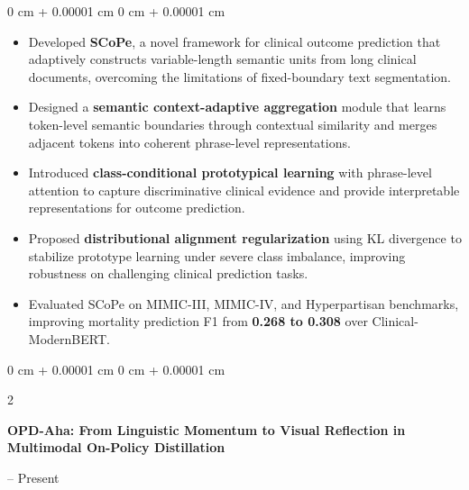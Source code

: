 \documentclass[10pt, letterpaper]{article}
\newenvironment{highlights}{
    \begin{itemize}[
        topsep=0.10 cm,
        parsep=0.10 cm,
        partopsep=0pt,
        itemsep=0pt,
        leftmargin=0 cm + 10pt
    ]
}{
    \end{itemize}
} %
\newenvironment{onecolentry}{
    \begin{adjustwidth}{
        0 cm + 0.00001 cm
    }{
        0 cm + 0.00001 cm
    }
}{
    \end{adjustwidth}
} %
\newenvironment{twocolentry}[2][]{
    \onecolentry
    \def\secondColumn{#2}
    \setcolumnwidth{\fill, 4.5 cm}
    \begin{paracol}{2}
}{
    \switchcolumn \raggedleft \secondColumn
    \end{paracol}
    \endonecolentry
} %
\begin{document}
\vspace{0.05 cm}
\begin{onecolentry}
    \begin{highlights}
        \item Developed \textbf{SCoPe}, a novel framework for clinical outcome prediction that adaptively constructs variable-length semantic units from long clinical documents, overcoming the limitations of fixed-boundary text segmentation.

        \item Designed a \textbf{semantic context-adaptive aggregation} module that learns token-level semantic boundaries through contextual similarity and merges adjacent tokens into coherent phrase-level representations.

        \item Introduced \textbf{class-conditional prototypical learning} with phrase-level attention to capture discriminative clinical evidence and provide interpretable representations for outcome prediction.

        \item Proposed \textbf{distributional alignment regularization} using KL divergence to stabilize prototype learning under severe class imbalance, improving robustness on challenging clinical prediction tasks.

        \item Evaluated SCoPe on MIMIC-III, MIMIC-IV, and Hyperpartisan benchmarks, improving mortality prediction F1 from \textbf{0.268 to 0.308} over Clinical-ModernBERT. 
    \end{highlights}
\end{onecolentry}


\begin{twocolentry}{
    2026 -- Present
}
    \textbf{OPD-Aha: From Linguistic Momentum to Visual Reflection in Multimodal On-Policy Distillation}
\end{twocolentry}
\end{document}
